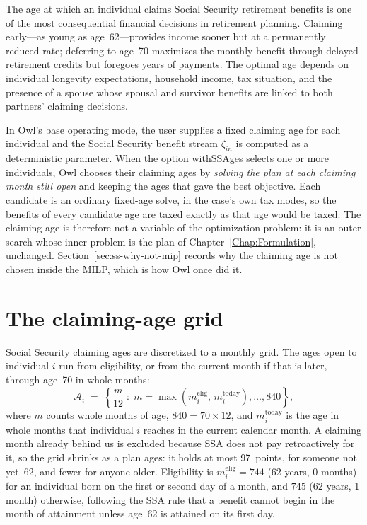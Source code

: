 \documentclass[fleqn,12pt]{report}
\newcommand{\code}[1]{\url{#1}}
\begin{document}
The age at which an individual claims Social Security retirement benefits is one of
the most consequential financial decisions in retirement planning.
Claiming early---as young as age~62---provides income sooner but at a permanently
reduced rate; deferring to age~70 maximizes the monthly benefit through delayed
retirement credits but foregoes years of payments.
The optimal age depends on individual longevity expectations, household income,
tax situation, and the presence of a spouse whose spousal and survivor benefits
are linked to both partners' claiming decisions.

In Owl's base operating mode, the user supplies a fixed claiming age for each
individual and the Social Security benefit stream $\bar{\zeta}_{in}$ is computed
as a deterministic parameter.
When the option \code{withSSAges} selects one or more individuals, Owl chooses
their claiming ages by \emph{solving the plan at each claiming month still open}
and keeping the ages that gave the best objective.
Each candidate is an ordinary fixed-age solve, in the case's own tax modes, so
the benefits of every candidate age are taxed exactly as that age would be taxed.
The claiming age is therefore not a variable of the optimization problem: it is
an outer search whose inner problem is the plan of
Chapter~\ref{Chap:Formulation}, unchanged.
Section~\ref{sec:ss-why-not-mip} records why the claiming age is not chosen
inside the MILP, which is how Owl once did it.

\section{The claiming-age grid}
\label{sec:ss-grid}

Social Security claiming ages are discretized to a monthly grid.
The ages open to individual $i$ run from eligibility, or from the current month
if that is later, through age~70 in whole months:
\begin{equation}
    \label{Eq:SSAopen}
    \mathcal{A}_i \;=\;
    \left\{ \frac{m}{12} \;:\;
        m = \max\!\left(m^\mathrm{elig}_i,\, m^\mathrm{today}_i\right), \ldots, 840
    \right\},
\end{equation}
where $m$ counts whole months of age, $840 = 70 \times 12$, and
$m^\mathrm{today}_i$ is the age in whole months that individual $i$ reaches in
the current calendar month.
A claiming month already behind us is excluded because SSA does not pay
retroactively for it, so the grid shrinks as a plan ages: it holds at most
97~points, for someone not yet~62, and fewer for anyone older.
Eligibility is $m^\mathrm{elig}_i = 744$ (62 years, 0 months) for an individual
born on the first or second day of a month, and $745$ (62 years, 1 month)
otherwise, following the SSA rule that a benefit cannot begin in the month of
attainment unless age~62 is attained on its first day.
\end{document}
